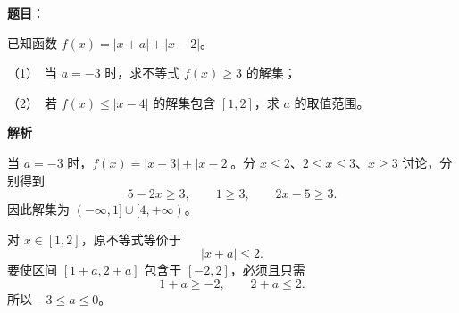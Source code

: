 \begin{answer}

\textbf{题目}：

已知函数 $f(x)=|x+a|+|x-2|$。

（1）　当 $a=-3$ 时，求不等式 $f(x)\geqslant3$ 的解集；

（2）　若 $f(x)\leqslant|x-4|$ 的解集包含 $[1,2]$，求 $a$ 的取值范围。

\textbf{解析}


当 $a=-3$ 时，$f(x)=|x-3|+|x-2|$。分 $x\leqslant2$、$2\leqslant x\leqslant3$、$x\geqslant3$ 讨论，分别得到
\nopagebreak[4]
\[
5-2x\geqslant3,\qquad1\geqslant3,\qquad2x-5\geqslant3.
\]
因此解集为 $(-\infty,1]\cup[4,+\infty)$。


对 $x\in[1,2]$，原不等式等价于
\nopagebreak[4]
\[
|x+a|\leqslant2.
\]
要使区间 $[1+a,2+a]$ 包含于 $[-2,2]$，必须且只需
\nopagebreak[4]
\[
1+a\geqslant-2,\qquad2+a\leqslant2.
\]
所以 $-3\leqslant a\leqslant0$。

\gkanswer{答案（1）：$(-\infty,1]\cup[4,+\infty)$。}


\end{answer}